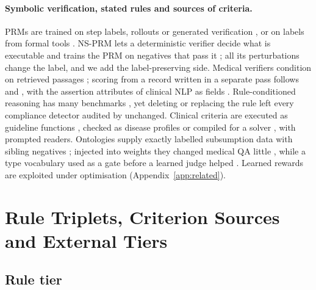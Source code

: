 \documentclass[11pt]{article}
\begin{document}
\paragraph{Symbolic verification, stated rules and sources of criteria.}
PRMs are trained on step labels, rollouts or generated verification
\citep{lightman2024verify,wang2024mathshepherd,khalifa2025thinkprm,zhao2025genprm},
or on labels from formal tools \citep{kamoi2026fover}. NS-PRM lets a
deterministic verifier decide what is executable and trains the PRM on
negatives that pass it \citep{zi2026nsprm}; all its perturbations change the
label, and we add the label-preserving side. Medical verifiers condition
on retrieved passages \citep{yun2025medprm,zhang2026medtiv}; scoring from a
record written in a separate pass follows \citet{dhuliawala2024cove} and
\citet{evpv2026}, with the assertion attributes of clinical NLP as fields
\citep{chapman2001negex,harkema2009context}. Rule-conditioned reasoning has
many benchmarks \citep{saeidi2018sharc,holzenberger2020sara,clark2020ruletaker,sun2024rulebench},
yet deleting or replacing the rule left every compliance detector audited by
\citet{sadhu2026compliance} unchanged. Clinical criteria are executed as guideline functions
\citep{cao2026guideskill}, checked as disease profiles \citep{cao2026veridx}
or compiled for a solver \citep{zhou2026verdict}, with prompted readers.
Ontologies supply exactly labelled subsumption data with sibling negatives
\citep{he2023ontolama,he2024hit,qu2026medieval}; injected into weights they
changed medical QA little \citep{liu2025ontotune}, while a type vocabulary
used as a gate before a learned judge helped \citep{shan2026ontgqa}. Learned
rewards are exploited under optimisation
\citep{skalse2022hacking,mahmoud2026hacking,pronesti2026vprm}
(Appendix~\ref{app:related}).

\section{Rule Triplets, Criterion Sources and External Tiers}
\label{sec:twins}

\subsection{Rule tier}
\end{document}
